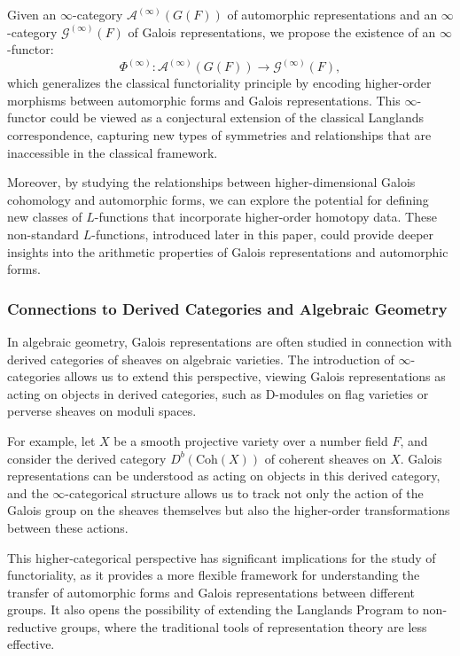 \documentclass{article}
\theoremstyle{remark}
\begin{document}
Given an $\infty$-category $\mathcal{A}^{(\infty)}(G(F))$ of automorphic representations and an $\infty$-category $\mathcal{G}^{(\infty)}(F)$ of Galois representations, we propose the existence of an $\infty$-functor:
\[
\Phi^{(\infty)}: \mathcal{A}^{(\infty)}(G(F)) \to \mathcal{G}^{(\infty)}(F),
\]
which generalizes the classical functoriality principle by encoding higher-order morphisms between automorphic forms and Galois representations. This $\infty$-functor could be viewed as a conjectural extension of the classical Langlands correspondence, capturing new types of symmetries and relationships that are inaccessible in the classical framework.

Moreover, by studying the relationships between higher-dimensional Galois cohomology and automorphic forms, we can explore the potential for defining new classes of $L$-functions that incorporate higher-order homotopy data. These non-standard $L$-functions, introduced later in this paper, could provide deeper insights into the arithmetic properties of Galois representations and automorphic forms.

\subsubsection{Connections to Derived Categories and Algebraic Geometry}

In algebraic geometry, Galois representations are often studied in connection with derived categories of sheaves on algebraic varieties. The introduction of $\infty$-categories allows us to extend this perspective, viewing Galois representations as acting on objects in derived categories, such as D-modules on flag varieties or perverse sheaves on moduli spaces.

For example, let $X$ be a smooth projective variety over a number field $F$, and consider the derived category $D^b(\text{Coh}(X))$ of coherent sheaves on $X$. Galois representations can be understood as acting on objects in this derived category, and the $\infty$-categorical structure allows us to track not only the action of the Galois group on the sheaves themselves but also the higher-order transformations between these actions.

This higher-categorical perspective has significant implications for the study of functoriality, as it provides a more flexible framework for understanding the transfer of automorphic forms and Galois representations between different groups. It also opens the possibility of extending the Langlands Program to non-reductive groups, where the traditional tools of representation theory are less effective.
\end{document}
